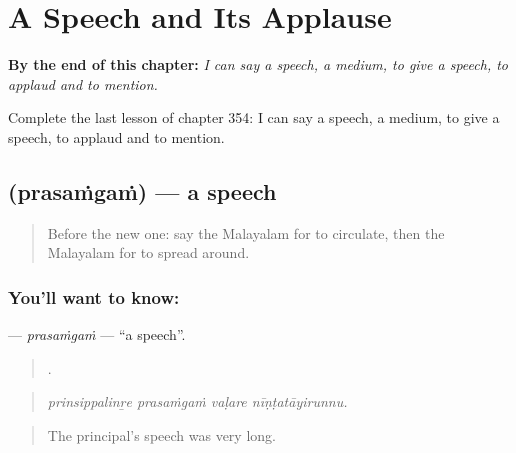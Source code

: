 
\chapter{A Speech and Its Applause}
\label{ch:ml-a-speech-and-its-applause}

\begin{chapteropening}
\textbf{By the end of this chapter:} \emph{I can say a speech, a medium, to give a speech, to applaud and to mention.}

Complete the last lesson of chapter 354: I can say a speech, a medium, to give a speech, to applaud and to mention.
\end{chapteropening}

\section[\texorpdfstring{\ml{പ്രസംഗം} (prasaṁgaṁ)}{പ്രസംഗം (prasaṁgaṁ)}]{ (prasaṁgaṁ) — a speech}

\label{lesson:ML-C354-prasamgam}



\begin{quote}
Before the new one: say the Malayalam for to circulate, then the Malayalam for to spread around.
\end{quote}

\subsection*{You'll want to know: }
\textbf{} — \emph{prasaṁgaṁ} — \textquotedblleft{}a speech\textquotedblright{}.

\begin{quote}
   .
\end{quote}

\begin{quote}
\emph{prinsippalinṟe prasaṁgaṁ vaḷare nīṇṭatāyirunnu.}
\end{quote}

\begin{quote}
The principal's speech was very long.
\end{quote}

